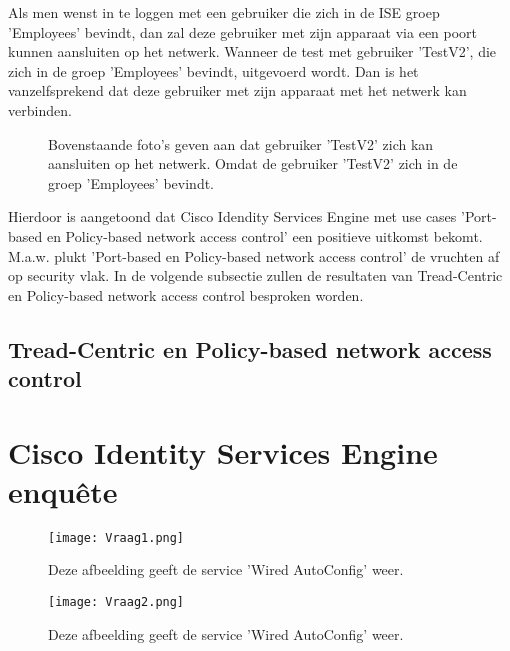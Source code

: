 Als men wenst in te loggen met een gebruiker die zich in de ISE groep 'Employees' bevindt, dan zal deze gebruiker met zijn apparaat via een poort kunnen aansluiten op het netwerk. 
\newline
\newline
Wanneer de test met gebruiker 'TestV2', die zich in de groep 'Employees' bevindt, uitgevoerd wordt. Dan is het vanzelfsprekend dat deze gebruiker met zijn apparaat met het netwerk kan verbinden.

\begin{figure}[H]
	\centering
	\qquad
	\newline
	\qquad
	\caption{Bovenstaande foto's geven aan dat gebruiker 'TestV2' zich kan aansluiten op het netwerk. Omdat de gebruiker 'TestV2' zich in de groep 'Employees' bevindt.}%
	\label{fig:Test_gebruiker}%
\end{figure}

Hierdoor is aangetoond dat Cisco Idendity Services Engine met use cases 'Port-based en Policy-based network access control' een positieve uitkomst bekomt. M.a.w. plukt 'Port-based en Policy-based network access control' de vruchten af op security vlak. In de volgende subsectie zullen de resultaten van Tread-Centric en Policy-based network access control besproken worden.


\subsection{Tread-Centric en Policy-based network access control}
\section{Cisco Identity Services Engine enquête}

\begin{figure}[H]
	\centering
	\texttt{[image: Vraag1.png]}
	\caption{Deze afbeelding geeft de service 'Wired AutoConfig' weer.}
\end{figure}

\begin{figure}[H]
	\centering
	\texttt{[image: Vraag2.png]}
	\caption{Deze afbeelding geeft de service 'Wired AutoConfig' weer.}
\end{figure}

